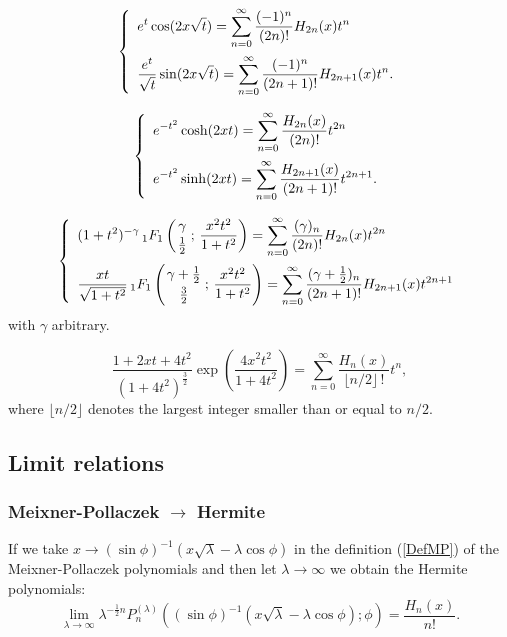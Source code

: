 \documentclass[envcountchap,graybox]{svmono}
\newcommand{\hyp}[5]{\mbox{}_{#1}{F}_{#2}
\left(\genfrac{}{}{0pt}{}{#3}{#4}\,;\,#5\right)}
\begin{document}
\begin{equation}
\label{GenHermite2}
\left\{\begin{array}{l}
\displaystyle{e}^t\cos(2x\sqrt{t})=\sum_{n=0}^{\infty}
\frac{(-1)^n}{(2n)!}H_{2n}(x)t^n\\[5mm]
\displaystyle\frac{{e}^t}{\sqrt{t}}\sin(2x\sqrt{t})=\sum_{n=0}^{\infty}
\frac{(-1)^n}{(2n+1)!}H_{2n+1}(x)t^n.
\end{array}\right.
\end{equation}

\begin{equation}
\label{GenHermite3}
\left\{\begin{array}{l}
\displaystyle {e}^{-t^2}\cosh(2xt)=\sum_{n=0}^{\infty}
\frac{H_{2n}(x)}{(2n)!}t^{2n}\\[5mm]
\displaystyle{e}^{-t^2}\sinh(2xt)=\sum_{n=0}^{\infty}
\frac{H_{2n+1}(x)}{(2n+1)!}t^{2n+1}.
\end{array}\right.
\end{equation}

\begin{equation}
\label{GenHermite4}
\left\{\begin{array}{l}
\displaystyle (1+t^2)^{-\gamma}\,\hyp{1}{1}{\gamma}{\frac{1}{2}}{\frac{x^2t^2}{1+t^2}}=
\sum_{n=0}^{\infty}\frac{(\gamma)_n}{(2n)!}H_{2n}(x)t^{2n}\\[5mm]
\displaystyle\frac{xt}{\sqrt{1+t^2}}\,
\hyp{1}{1}{\gamma+\frac{1}{2}}{\frac{3}{2}}{\frac{x^2t^2}{1+t^2}}
=\sum_{n=0}^{\infty}\frac{(\gamma+\frac{1}{2})_n}{(2n+1)!}H_{2n+1}(x)t^{2n+1}
\end{array}\right.
\end{equation}
with $\gamma$ arbitrary.

\begin{equation}
\label{GenHermite5}
\frac{1+2xt+4t^2}{(1+4t^2)^{\frac{3}{2}}}\exp\left(\frac{4x^2t^2}{1+4t^2}\right)
=\sum_{n=0}^{\infty}\frac{H_n(x)}{\lfloor n/2\rfloor\,!}t^n,
\end{equation}
where $\lfloor n/2\rfloor$ denotes the largest integer smaller than or equal to $n/2$.

\subsection*{Limit relations}

\subsubsection*{Meixner-Pollaczek $\rightarrow$ Hermite}
If we take $x\rightarrow (\sin\phi)^{-1}(x\sqrt{\lambda}-\lambda\cos\phi)$
in the definition (\ref{DefMP}) of the Meixner-Pollaczek polynomials and
then let $\lambda\rightarrow\infty$ we obtain the Hermite polynomials:
$$\lim_{\lambda\rightarrow\infty}
\lambda^{-\frac{1}{2}n}P_n^{(\lambda)}
((\sin\phi)^{-1}(x\sqrt{\lambda}-\lambda\cos\phi);\phi)=\frac{H_n(x)}{n!}.$$
\end{document}
